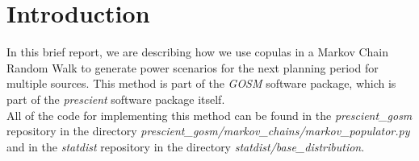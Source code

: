 \section{Introduction}

In this brief report, we are describing how we use copulas in a Markov Chain Random Walk to generate power scenarios for the next planning period for multiple sources. This method is part of the \emph{GOSM} software package, which is part of the \emph{prescient} software package itself.\\

All  of the code for implementing this method can be found in the \emph{prescient\_gosm} repository in the directory \emph{prescient\_gosm/markov\_chains/markov\_populator.py} and in the \emph{statdist} repository in the directory \emph{statdist/base\_distribution}.